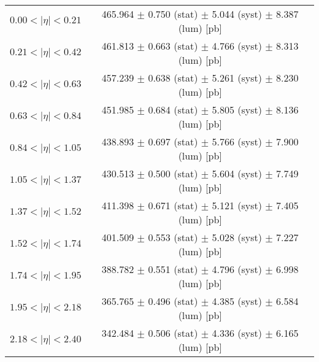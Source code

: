 \begin{tabular}{lc}
\hline
$0.00 < |\eta| <0.21$          & 465.964 $\pm$ 0.750 (stat) $\pm$ 5.044 (syst) $\pm$ 8.387 (lum) [pb]  \\
$0.21 < |\eta| <0.42$          & 461.813 $\pm$ 0.663 (stat) $\pm$ 4.766 (syst) $\pm$ 8.313 (lum) [pb]  \\
$0.42 < |\eta| <0.63$          & 457.239 $\pm$ 0.638 (stat) $\pm$ 5.261 (syst) $\pm$ 8.230 (lum) [pb]  \\
$0.63 < |\eta| <0.84$          & 451.985 $\pm$ 0.684 (stat) $\pm$ 5.805 (syst) $\pm$ 8.136 (lum) [pb]  \\
$0.84 < |\eta| <1.05$          & 438.893 $\pm$ 0.697 (stat) $\pm$ 5.766 (syst) $\pm$ 7.900 (lum) [pb]  \\
$1.05 < |\eta| <1.37$          & 430.513 $\pm$ 0.500 (stat) $\pm$ 5.604 (syst) $\pm$ 7.749 (lum) [pb]  \\
$1.37 < |\eta| <1.52$          & 411.398 $\pm$ 0.671 (stat) $\pm$ 5.121 (syst) $\pm$ 7.405 (lum) [pb]  \\
$1.52 < |\eta| <1.74$          & 401.509 $\pm$ 0.553 (stat) $\pm$ 5.028 (syst) $\pm$ 7.227 (lum) [pb]  \\
$1.74 < |\eta| <1.95$          & 388.782 $\pm$ 0.551 (stat) $\pm$ 4.796 (syst) $\pm$ 6.998 (lum) [pb]  \\
$1.95 < |\eta| <2.18$          & 365.765 $\pm$ 0.496 (stat) $\pm$ 4.385 (syst) $\pm$ 6.584 (lum) [pb]  \\
$2.18 < |\eta| <2.40$          & 342.484 $\pm$ 0.506 (stat) $\pm$ 4.336 (syst) $\pm$ 6.165 (lum) [pb]  \\
\hline
\end{tabular}
